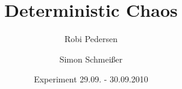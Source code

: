 \documentclass[a4paper,oneside]{scrartcl} %
\title{Deterministic Chaos}
\author{Robi Pedersen \and Simon Schmeißer}
\date{Experiment 29.09. - 30.09.2010}
\begin{document}
\begin{titlepage}
  \maketitle
  \vfill
  \thispagestyle{empty}
\end{titlepage}

\tableofcontents
\clearpage



%




\clearpage

% 
%
\end{document}
